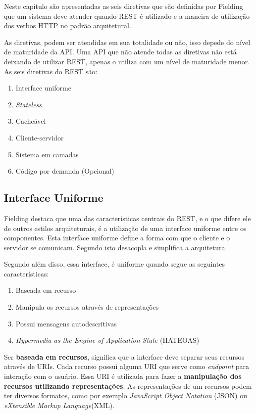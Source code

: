 Neste capítulo são apresentadas as seis diretivas que são definidas por Fielding
que um sistema deve atender quando REST é utilizado e a maneira de utilização dos
verbos HTTP no padrão arquitetural. 

As diretivas, podem ser atendidas em sua totalidade
ou não, isso depede do nível de maturidade da API. Uma API que não atende todas as diretivas 
não está deixando de utilizar REST, apenas o utiliza com um nível de maturidade
menor. As seis diretivas do REST são:

\begin{enumerate}
  \item Interface uniforme
  \item \textit{Stateless}
  \item Cacheável
  \item Cliente-servidor
  \item Sistema em camadas
  \item Código por demanda (Opcional)
\end{enumerate}

\subsection{Interface Uniforme}

Fielding \cite{fielding} destaca que uma das características centrais do REST, e o que difere ele 
de outros estilos arquiteturais, é a utilização de uma interface uniforme entre os componentes. 
Esta interface uniforme define a forma com que o cliente e o servidor se comunicam. Segundo \cite{todd}
isto desacopla e simplifica a arquitetura.

Segundo \cite{todd} além disso, essa interface, é uniforme quando segue as seguintes características:

\begin{enumerate}
  \item Baseada em recurso
  \item Manipula os recursos através de representações
  \item Possui mensagens autodescritivas
  \item \textit{Hypermedia as the Engine of Application State} (HATEOAS)
\end{enumerate}

Ser \textbf{baseada em recursos}, significa que a interface deve separar seus
recursos através de URIs. 
Cada recurso possui alguma URI que serve como \textit{endpoint} para interação com o usuário. 
Essa URI é utilizada para fazer a \textbf{manipulação dos recursos utilizando representações}.
As representações de um recursos podem ter diversos formatos, como por exemplo 
\textit{JavaScript Object Notation} (JSON) ou \textit{eXtensible Markup Language}(XML).

